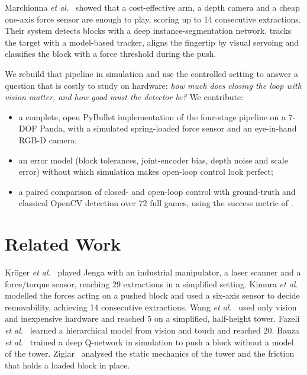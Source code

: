 \documentclass[conference]{IEEEtran}
\begin{document}
Marchionna \emph{et al.}~\cite{marchionna2023} showed that a cost-effective arm, a
depth camera and a cheap one-axis force sensor are enough to play, scoring up to 14
consecutive extractions. Their system detects blocks with a deep instance-segmentation
network, tracks the target with a model-based tracker, aligns the fingertip by
visual servoing and classifies the block with a force threshold during the push.

We rebuild that pipeline in simulation and use the controlled setting to answer a
question that is costly to study on hardware: \emph{how much does closing the loop
with vision matter, and how good must the detector be?} We contribute:
\begin{itemize}
\item a complete, open PyBullet implementation of the four-stage pipeline on a
7-DOF Panda, with a simulated spring-loaded force sensor and an eye-in-hand RGB-D
camera;
\item an error model (block tolerances, joint-encoder bias, depth noise and scale
error) without which simulation makes open-loop control look perfect;
\item a paired comparison of closed- and open-loop control with ground-truth and
classical OpenCV detection over 72 full games, using the success metric of
\cite{marchionna2023}.
\end{itemize}

\section{Related Work}

Kr\"oger \emph{et al.}~\cite{kroger2008} played Jenga with an industrial manipulator,
a laser scanner and a force/torque sensor, reaching 29 extractions in a simplified
setting. Kimura \emph{et al.}~\cite{kimura2010} modelled the forces acting on a pushed
block and used a six-axis sensor to decide removability, achieving 14 consecutive
extractions. Wang \emph{et al.}~\cite{wang2009} used only vision and inexpensive
hardware and reached 5 on a simplified, half-height tower. Fazeli
\emph{et al.}~\cite{fazeli2019} learned a hierarchical model from vision and touch and
reached 20. Bauza \emph{et al.}~\cite{bauza2017} trained a deep Q-network in simulation
to push a block without a model of the tower. Ziglar~\cite{ziglar2006}
analysed the static mechanics of the tower and the friction that holds a loaded
block in place.
\end{document}
